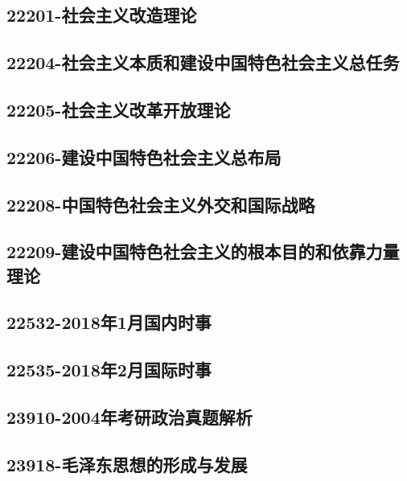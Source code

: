 \subsection{22201-社会主义改造理论}

\subsection{22204-社会主义本质和建设中国特色社会主义总任务}

\subsection{22205-社会主义改革开放理论}

\subsection{22206-建设中国特色社会主义总布局}

\subsection{22208-中国特色社会主义外交和国际战略}

\subsection{22209-建设中国特色社会主义的根本目的和依靠力量理论}

\subsection{22532-2018年1月国内时事}

\subsection{22535-2018年2月国际时事}

\subsection{23910-2004年考研政治真题解析}

\subsection{23918-毛泽东思想的形成与发展}

